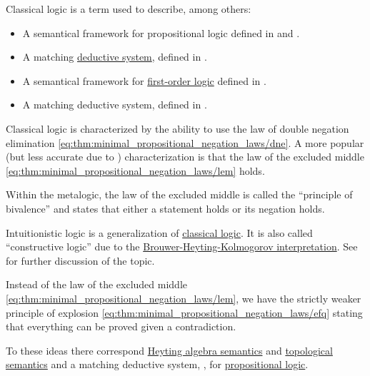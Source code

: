 \begin{remark}\label{rem:classical_logic}
  Classical logic is a term used to describe, among others:
  \begin{itemize}
    \item A semantical framework for propositional logic defined in  and .
    \item A matching \hyperref[def:deductive_system]{deductive system}, defined in .
    \item A semantical framework for \hyperref[subsec:first_order_logic]{first-order logic} defined in .
    \item A matching deductive system, defined in .
  \end{itemize}

  Classical logic is characterized by the ability to use the law of double negation elimination \eqref{eq:thm:minimal_propositional_negation_laws/dne}. A more popular (but less accurate due to ) characterization is that the law of the excluded middle \eqref{eq:thm:minimal_propositional_negation_laws/lem} holds.

  Within the metalogic, the law of the excluded middle is called the \enquote{principle of bivalence} and states that either a statement holds or its negation holds.
\end{remark}

\begin{remark}\label{rem:intuitionistic_logic}
  Intuitionistic logic is a generalization of \hyperref[rem:classical_logic]{classical logic}. It is also called \enquote{constructive logic} due to the \hyperref[rem:brouwer_heyting_kolmogorov_interpretation]{Brouwer-Heyting-Kolmogorov interpretation}. See  for further discussion of the topic.

  Instead of the law of the excluded middle \eqref{eq:thm:minimal_propositional_negation_laws/lem}, we have the strictly weaker principle of explosion \eqref{eq:thm:minimal_propositional_negation_laws/efq} stating that everything can be proved given a contradiction.

  To these ideas there correspond \hyperref[def:propositional_heyting_algebra_semantics]{Heyting algebra semantics} and \hyperref[def:propositional_topological_semantics]{topological semantics} and a matching deductive system, , for \hyperref[subsec:propositional_logic]{propositional logic}.
\end{remark}

